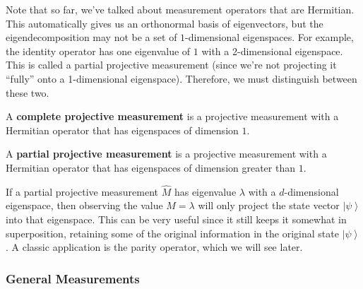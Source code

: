 \documentclass{article}
\newcommand{\ket}[1]{\ensuremath{\left|#1\right\rangle}}
\begin{document}
      Note that so far, we've talked about measurement operators that are Hermitian. This automatically gives us an orthonormal basis of eigenvectors, but the eigendecomposition may not be a set of $1$-dimensional eigenspaces. For example, the identity operator has one eigenvalue of $1$ with a 2-dimensional eigenspace. This is called a partial projective measurement (since we're not projecting it ``fully'' onto a 1-dimensional eigenspace). Therefore, we must distinguish between these two. 

      \begin{definition}
        A \textbf{complete projective measurement} is a projective measurement with a Hermitian operator that has eigenspaces of dimension $1$.
      \end{definition}

      \begin{definition}
        A \textbf{partial projective measurement} is a projective measurement with a Hermitian operator that has eigenspaces of dimension greater than $1$. 
      \end{definition}

      If a partial projective measurement $\hat{M}$ has eigenvalue $\lambda$ with a $d$-dimensional eigenspace, then observing the value $M = \lambda$ will only project the state vector $\ket{\psi}$ into that eigenspace. This can be very useful since it still keeps it somewhat in superposition, retaining some of the original information in the original state $\ket{\psi}$. A classic application is the parity operator, which we will see later. 

    \subsubsection{General Measurements} 
\end{document}
